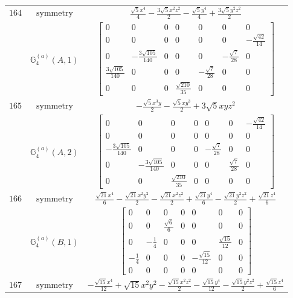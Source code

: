 \documentclass[fleqn,8pt,landscape]{jsarticle}
\begin{document}
\begin{longtable}{ccc}
$ 164 $ & $ \text{symmetry} $ & $ \frac{\sqrt{5} x^{4}}{4} - \frac{3 \sqrt{5} x^{2} z^{2}}{2} - \frac{\sqrt{5} y^{4}}{4} + \frac{3 \sqrt{5} y^{2} z^{2}}{2} $ \\
$  $ & $ \mathbb{G}_{4}^{(a)}(A,1) $ & $ \begin{bmatrix} 0 & 0 & 0 & 0 & 0 & 0 & 0 \\ 0 & 0 & 0 & 0 & 0 & 0 & - \frac{\sqrt{42}}{14} \\ 0 & - \frac{3 \sqrt{105}}{140} & 0 & 0 & 0 & - \frac{\sqrt{7}}{28} & 0 \\ \frac{3 \sqrt{105}}{140} & 0 & 0 & 0 & - \frac{\sqrt{7}}{28} & 0 & 0 \\ 0 & 0 & 0 & \frac{\sqrt{210}}{35} & 0 & 0 & 0 \end{bmatrix} $ \\ \hline
$ 165 $ & $ \text{symmetry} $ & $ - \frac{\sqrt{5} x^{3} y}{2} - \frac{\sqrt{5} x y^{3}}{2} + 3 \sqrt{5} x y z^{2} $ \\
$  $ & $ \mathbb{G}_{4}^{(a)}(A,2) $ & $ \begin{bmatrix} 0 & 0 & 0 & 0 & 0 & 0 & - \frac{\sqrt{42}}{14} \\ 0 & 0 & 0 & 0 & 0 & 0 & 0 \\ - \frac{3 \sqrt{105}}{140} & 0 & 0 & 0 & - \frac{\sqrt{7}}{28} & 0 & 0 \\ 0 & - \frac{3 \sqrt{105}}{140} & 0 & 0 & 0 & \frac{\sqrt{7}}{28} & 0 \\ 0 & 0 & \frac{\sqrt{210}}{35} & 0 & 0 & 0 & 0 \end{bmatrix} $ \\ \hline
$ 166 $ & $ \text{symmetry} $ & $ \frac{\sqrt{21} x^{4}}{6} - \frac{\sqrt{21} x^{2} y^{2}}{2} - \frac{\sqrt{21} x^{2} z^{2}}{2} + \frac{\sqrt{21} y^{4}}{6} - \frac{\sqrt{21} y^{2} z^{2}}{2} + \frac{\sqrt{21} z^{4}}{6} $ \\
$  $ & $ \mathbb{G}_{4}^{(a)}(B,1) $ & $ \begin{bmatrix} 0 & 0 & 0 & 0 & 0 & 0 & 0 \\ 0 & 0 & \frac{\sqrt{6}}{6} & 0 & 0 & 0 & 0 \\ 0 & - \frac{1}{4} & 0 & 0 & 0 & \frac{\sqrt{15}}{12} & 0 \\ - \frac{1}{4} & 0 & 0 & 0 & - \frac{\sqrt{15}}{12} & 0 & 0 \\ 0 & 0 & 0 & 0 & 0 & 0 & 0 \end{bmatrix} $ \\ \hline
$ 167 $ & $ \text{symmetry} $ & $ - \frac{\sqrt{15} x^{4}}{12} + \sqrt{15} x^{2} y^{2} - \frac{\sqrt{15} x^{2} z^{2}}{2} - \frac{\sqrt{15} y^{4}}{12} - \frac{\sqrt{15} y^{2} z^{2}}{2} + \frac{\sqrt{15} z^{4}}{6} $ \\

\end{longtable}
\end{document}
